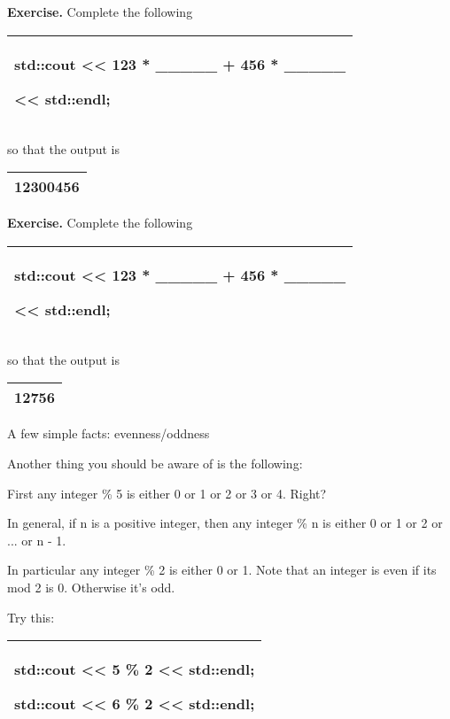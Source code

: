 \documentclass[
]{article}
\begin{document}
\textbf{Exercise.} Complete the following

\begin{longtable}[]{@{}l@{}}
\toprule
\endhead
\begin{minipage}[t]{0.97\columnwidth}\raggedright
std::cout \textless\textless{} 123 * \_\_\_\_\_ + 456 * \_\_\_\_\_

\textless\textless{} std::endl;\strut
\end{minipage}\tabularnewline
\bottomrule
\end{longtable}

so that the output is

\begin{longtable}[]{@{}l@{}}
\toprule
\endhead
12300456\tabularnewline
\bottomrule
\end{longtable}

\textbf{Exercise.} Complete the following

\begin{longtable}[]{@{}l@{}}
\toprule
\endhead
\begin{minipage}[t]{0.97\columnwidth}\raggedright
std::cout \textless\textless{} 123 * \_\_\_\_\_ + 456 * \_\_\_\_\_

\textless\textless{} std::endl;\strut
\end{minipage}\tabularnewline
\bottomrule
\end{longtable}

so that the output is

\begin{longtable}[]{@{}l@{}}
\toprule
\endhead
12756\tabularnewline
\bottomrule
\end{longtable}

A few simple facts: evenness/oddness

Another thing you should be aware of is the following:

First any integer \% 5 is either 0 or 1 or 2 or 3 or 4. Right?

In general, if n is a positive integer, then any integer \% n is either
0 or 1 or 2 or ... or n - 1.

In particular any integer \% 2 is either 0 or 1. Note that an integer is
even if its mod 2 is 0. Otherwise it's odd.

Try this:

\begin{longtable}[]{@{}l@{}}
\toprule
\endhead
\begin{minipage}[t]{0.97\columnwidth}\raggedright
std::cout \textless\textless{} 5 \% 2 \textless\textless{} std::endl;

std::cout \textless\textless{} 6 \% 2 \textless\textless{}
std::endl;\strut
\end{minipage}\tabularnewline
\bottomrule
\end{longtable}
\end{document}
